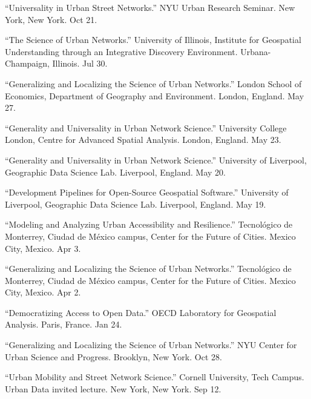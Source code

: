 \documentclass[11pt,letterpaper]{report} %
\begin{document}
\begin{tablist}
\item[2025] \tab{}\enquote{Universality in Urban Street Networks.} NYU Urban Research Seminar. New York, New York. Oct 21.

\item[2025] \tab{}\enquote{The Science of Urban Networks.} University of Illinois, Institute for Geospatial Understanding through an Integrative Discovery Environment. Urbana-Champaign, Illinois. Jul 30.

\item[2025] \tab{}\enquote{Generalizing and Localizing the Science of Urban Networks.} London School of Economics, Department of Geography and Environment. London, England. May 27.

\item[2025] \tab{}\enquote{Generality and Universality in Urban Network Science.} University College London, Centre for Advanced Spatial Analysis. London, England. May 23.

\item[2025] \tab{}\enquote{Generality and Universality in Urban Network Science.} University of Liverpool, Geographic Data Science Lab. Liverpool, England. May 20.

\item[2025] \tab{}\enquote{Development Pipelines for Open-Source Geospatial Software.} University of Liverpool, Geographic Data Science Lab. Liverpool, England. May 19.

\item[2025] \tab{}\enquote{Modeling and Analyzing Urban Accessibility and Resilience.} Tecnológico de Monterrey, Ciudad de México campus, Center for the Future of Cities. Mexico City, Mexico. Apr 3.

\item[2025] \tab{}\enquote{Generalizing and Localizing the Science of Urban Networks.} Tecnológico de Monterrey, Ciudad de México campus, Center for the Future of Cities. Mexico City, Mexico. Apr 2.

\item[2025] \tab{}\enquote{Democratizing Access to Open Data.} OECD Laboratory for Geospatial Analysis. Paris, France. Jan 24.

\item[2024] \tab{}\enquote{Generalizing and Localizing the Science of Urban Networks.} NYU Center for Urban Science and Progress. Brooklyn, New York. Oct 28.

\item[2024] \tab{}\enquote{Urban Mobility and Street Network Science.} Cornell University, Tech Campus. Urban Data invited lecture. New York, New York. Sep 12.


\end{tablist}
\end{document}
